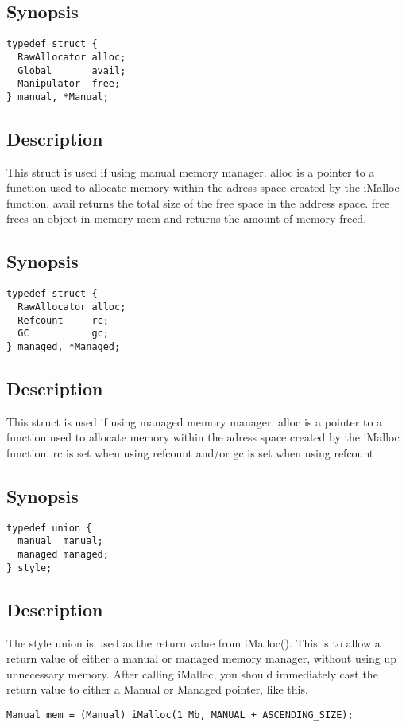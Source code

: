 \documentclass{article}
\begin{document}
\subsection*{Synopsis}
\begin{verbatim}
typedef struct {
  RawAllocator alloc;
  Global       avail;
  Manipulator  free;
} manual, *Manual; 
\end{verbatim}
\subsection*{Description}
This struct is used if using manual memory manager.
alloc is a pointer to a function used to allocate memory within the adress space created by the iMalloc function.
avail returns the total size of the free space in the address space.
free frees an object in memory mem and returns the amount of memory freed.

\subsection*{Synopsis}
\begin{verbatim}
typedef struct {
  RawAllocator alloc;
  Refcount     rc;
  GC           gc;
} managed, *Managed;
\end{verbatim}
\subsection*{Description}
This struct is used if using managed memory manager.
alloc is a pointer to a function used to allocate memory within the adress space created by the iMalloc function.
rc is set when using refcount and/or gc is set when using refcount

\subsection*{Synopsis}
\begin{verbatim}
typedef union {
  manual  manual;
  managed managed;
} style;
\end{verbatim}
\subsection*{Description}
The style union is used as the return value from iMalloc(). This is to allow a return value of either a manual or managed memory manager, without using up unnecessary memory.
After calling iMalloc, you should immediately cast the return value to either a Manual or Managed pointer, like this.
\begin{verbatim}
Manual mem = (Manual) iMalloc(1 Mb, MANUAL + ASCENDING_SIZE);
\end{verbatim}
\end{document}
